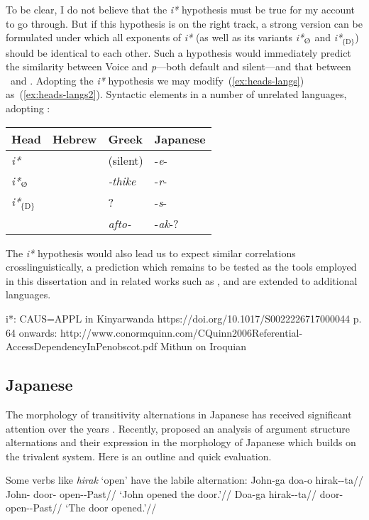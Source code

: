 To be clear, I do not believe that the \emph{i*} hypothesis must be true for my account to go through. But if this hypothesis is on the right track, a strong version can be formulated under which all exponents of \emph{i*} (as well as its variants \emph{i*}$_{\text{\zero}}$ and \emph{i*}$_{\{\text{D}\}}$) should be identical to each other. Such a hypothesis would immediately predict the similarity between Voice and \emph{p}---both default and silent---and that between \vz~and \pz. {Adopting the \emph{i*} hypothesis we may modify~(\ref{ex:heads-langs}) as~(\ref{ex:heads-langs2}).}
\ex\label{ex:heads-langs2}Syntactic elements in a number of unrelated languages, adopting \cite{woodmarantz15}:\\
	\begin{tabular}{l|lll}
	Head 		& Hebrew 		& Greek  		& Japanese\\\hline
	\emph{i*}   	& \tkal     & (silent)      & -\emph{e}-\\
	\emph{i*}$_{\text{\zero}}$ 	& \tnif 	& \emph{-thike}	& -\emph{r}-\\
	\emph{i*}$_{\text{\{D\}}}$	& \thif		& ?		& -\emph{s}-\\
	{\va}	& \tpie		& \emph{afto-}	& -\emph{ak}-?\\
	\end{tabular}
\xe

The \emph{i*} hypothesis would also lead us to expect similar correlations crosslinguistically, a prediction which remains to be tested as the tools employed in this dissertation and in related works such as \cite{schaefer08}, \cite{spathasetal15} and \cite{wood15springer} are extended to additional languages.


i*: CAUS=APPL in Kinyarwanda https://doi.org/10.1017/S0022226717000044
p. 64 onwards: http://www.conormquinn.com/CQuinn2006Referential-AccessDependencyInPenobscot.pdf
Mithun on Iroquian

	\subsection{Japanese} \label{i:i:jap}
The morphology of transitivity alternations in Japanese has received significant attention over the years \citep{suga80,jacobsen92,miyagawa98,nishiyama98,volpe05,harley08}. Recently, \cite{oseki17nyu} proposed an analysis of argument structure alternations and their expression in the morphology of Japanese which builds on the trivalent system. Here is an outline and quick evaluation.

Some verbs like \emph{hirak} `open' have the labile alternation:
\pex
	\a \begingl
		\gla John-ga doa-o hirak-\zero-ta//
		\glb John- door- open-\zero-Past//
		\glft `John opened the door.'//
	\endgl
	\a \begingl
		\gla Doa-ga hirak-\zero-ta//
		\glb door- open-\zero-Past//
		\glft `The door opened.'//
	\endgl
\xe

